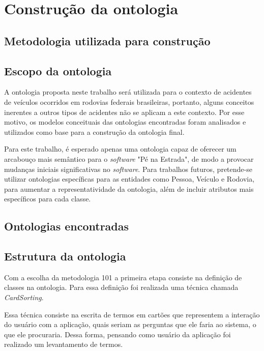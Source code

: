 \chapter{Construção da ontologia}

  \section{Metodologia utilizada para construção}
    
   
    
  \section{Escopo da ontologia}
      
      A ontologia proposta neste trabalho será utilizada para o contexto de acidentes de veículos ocorridos em rodovias
      federais brasileiras, portanto, alguns conceitos inerentes a outros tipos de acidentes não se aplicam a este 
      contexto. Por esse motivo, os modelos conceituais das ontologias encontradas foram analisados e utilizados como base 
      para a construção da ontologia final.
      
      Para este trabalho, é esperado apenas uma ontologia capaz de oferecer um arcabouço mais semântico para o \textit{software} 
      "Pé na Estrada", de modo a provocar mudanças iniciais significativas no \textit{software}.
      Para trabalhos futuros, pretende-se utilizar ontologias específicas para as entidades como Pessoa, Veículo e Rodovia, para
      aumentar a representatividade da ontologia, além de incluir atributos mais específicos para cada classe.
    
  \section{Ontologias encontradas}
   
      
      

  \section{Estrutura da ontologia}

      Com a escolha da metodologia 101 a primeira etapa consiste na definição de classes na ontologia.
      Para essa definição foi realizada uma técnica chamada \textit{CardSorting}. 
      
      Essa técnica consiste na escrita de termos em cartões que representem a interação do usuário com a aplicação,
      quais seriam as perguntas que ele faria ao sistema, o que ele procuraria. Dessa forma, pensando como usuário
      da aplicação foi realizado um levantamento de termos.

